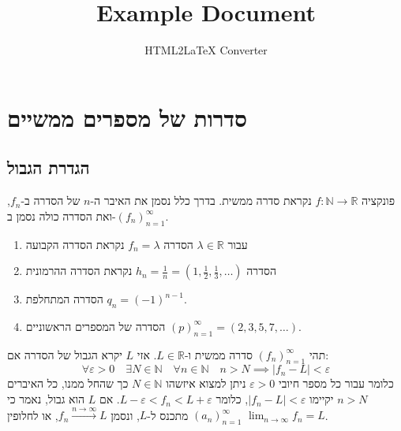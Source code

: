 \documentclass{tstextbook}
\begin{document}
\title{Example Document}
\author{HTML2LaTeX Converter}
\maketitle

\chapter{סדרות של מספרים ממשיים}

\section{הגדרת הגבול}

\begin{definition}
פונקציה \(f:\mathbb{N}\to \mathbb{R}\) נקראת סדרה ממשית. בדרך כלל נסמן את האיבר ה-\(n\) של הסדרה ב-\(f_{n}\), ואת הסדרה כולה נסמן ב-\((f_{n})_{n=1}^{\infty}\).

\end{definition}
\begin{example}
  \begin{enumerate}
    \item עבור \(\lambda \in \mathbb{R}\) הסדרה \(f_{n}=\lambda\) נקראת הסדרה הקבועה 


    \item הסדרה \(h_{n}=\frac{1}{n}=\left( 1,\frac{1}{2},\frac{1}{3},\dots \right)\) נקראת הסדרה ההרמונית 


    \item הסדרה המתחלפת \(q_{n}=(-1)^{n-1}\).  


    \item הסדרה של המספרים הראשוניים \((p)_{n=1}^{\infty}=\left( 2,3,5,7,\dots \right)\). 


  \end{enumerate}
\end{example}
\begin{definition}
תהי \((f_{n})_{n=1}^{\infty}\) סדרה ממשית ו-\(L \in \mathbb{R}\). אזי \(L\) יקרא הגבול של הסדרה אם:
$$\forall\varepsilon>0\quad \exists N \in \mathbb{N}\quad \forall n\in \mathbb{N}\quad n>N\implies |f_{n}-L|<\varepsilon$$
כלומר עבור כל מספר חיובי \(\varepsilon>0\) ניתן למצוא איזשהו \(N \in \mathbb{N}\) כך שהחל ממנו, כל האיברים \(n>N\) יקיימו \(|f_{n}-L|<\varepsilon\), כלומר \(L-\varepsilon<f_{n}<L+\varepsilon\).
אם \(L\) הוא גבול, נאמר כי \((a_n)_{n=1}^\infty\) מתכנס ל-\(L\), ונסמן \(f_{n}\xrightarrow{n\to \infty}L\), או לחלופין \(\lim_{ n \to \infty }f_{n}=L\).

\end{definition}
\end{document}
